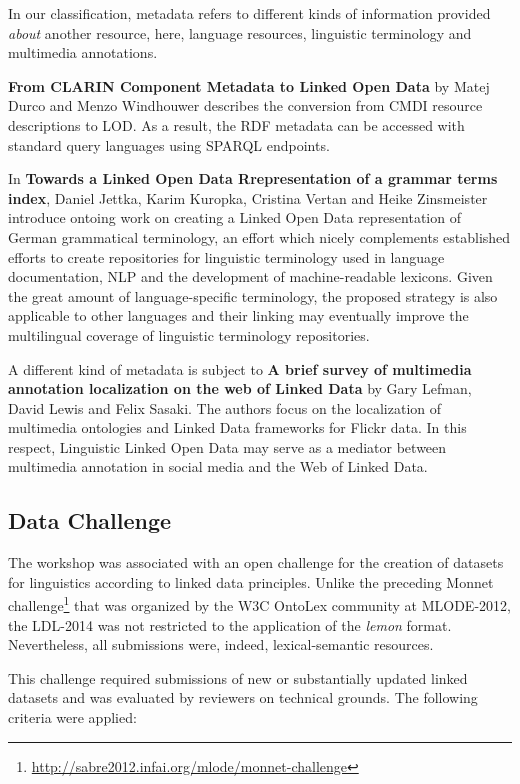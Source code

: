 	In our classification, metadata refers to different kinds of information provided \emph{about} another resource, here, language resources, linguistic terminology and multimedia annotations.
	
	\textbf{From CLARIN Component Metadata to Linked Open Data} by 
	Matej Durco and Menzo Windhouwer describes the conversion from CMDI resource descriptions to LOD. 
	As a result, the RDF metadata can be accessed with standard query languages using SPARQL endpoints. 

	In \textbf{Towards a Linked Open Data Rrepresentation of a grammar terms index},
	Daniel Jettka, Karim Kuropka, Cristina Vertan and Heike Zinsmeister introduce ontoing work on creating a Linked Open Data 
	representation of German grammatical terminology, an effort which nicely complements established efforts to create repositories for linguistic terminology used in language documentation, NLP and the development of machine-readable lexicons. Given the great amount of language-specific terminology, the proposed strategy is also applicable to other languages and their linking may eventually improve the multilingual coverage of linguistic terminology repositories.

	A different kind of metadata is subject to \textbf{A brief survey of multimedia annotation localization on the web of Linked Data} by 
	Gary Lefman, David Lewis and Felix Sasaki. The authors focus on the localization of multimedia ontologies and Linked Data frameworks for Flickr data. 
	In this respect, Linguistic Linked Open Data may serve as a mediator between multimedia annotation in social media and the Web of Linked Data. 

\subsection{Data Challenge}

The workshop was associated with an open challenge for the creation of datasets for linguistics according to linked data principles.
Unlike the preceding Monnet challenge\footnote{
	\url{http://sabre2012.infai.org/mlode/monnet-challenge}
} 
that was organized by the W3C OntoLex community at MLODE-2012, the LDL-2014 was not restricted to the application of the \emph{lemon} format. 
Nevertheless, all submissions were, indeed, lexical-semantic resources.
 
This challenge required submissions of new or substantially updated linked datasets and was evaluated by reviewers on technical grounds. 
The following criteria were applied: 

